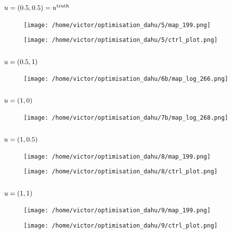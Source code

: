 \documentclass[../../Main_ManuscritThese.tex]{subfiles}
\begin{document}
\subsection*{$u=(0.5, 0.5) = u^{\mathrm{truth}}$}
\begin{figure}[ht]
  \centering
  \texttt{[image: /home/victor/optimisation\_dahu/5/map\_199.png]}
\end{figure}
\begin{figure}[ht]
  \centering
  \texttt{[image: /home/victor/optimisation\_dahu/5/ctrl\_plot.png]}
\end{figure}
\clearpage
\subsection*{$u=(0.5, 1)$}
\begin{figure}[ht]
  \centering
  \texttt{[image: /home/victor/optimisation\_dahu/6b/map\_log\_266.png]}
\end{figure}
\begin{figure}[ht]
  \centering
    \resizebox{1\textwidth}{!}{}
\end{figure}
\clearpage
\subsection*{$u=(1, 0)$}

\begin{figure}[ht]
  \centering
  \texttt{[image: /home/victor/optimisation\_dahu/7b/map\_log\_268.png]}
\end{figure}
\begin{figure}[ht]
  \centering
  \resizebox{1\textwidth}{!}{}
\end{figure}
\clearpage
\subsection*{$u=(1, 0.5)$}
\begin{figure}[ht]
  \centering
  \texttt{[image: /home/victor/optimisation\_dahu/8/map\_199.png]}
\end{figure}
\begin{figure}[ht]
  \centering
  \texttt{[image: /home/victor/optimisation\_dahu/8/ctrl\_plot.png]}
\end{figure}
\clearpage
\subsection*{$u=(1, 1)$}
\begin{figure}[ht]
  \centering
  \texttt{[image: /home/victor/optimisation\_dahu/9/map\_199.png]}
\end{figure}
\begin{figure}[ht]
  \centering
  \texttt{[image: /home/victor/optimisation\_dahu/9/ctrl\_plot.png]}
\end{figure}
\clearpage




\pagestyle{appendixStyle}



\subfileLocal{
	\pagestyle{empty}
	
	

}

\endgroup
\end{document}
